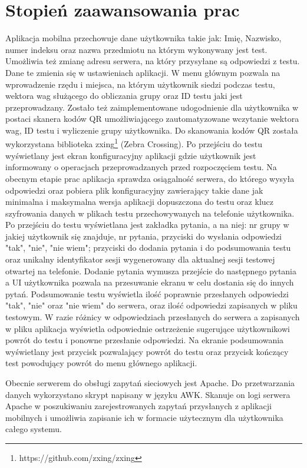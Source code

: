 \documentclass{report}
\begin{document}
	\chapter{Stopień zaawansowania prac}
	
	Aplikacja mobilna przechowuje dane użytkownika takie jak: Imię, Nazwisko, numer indeksu oraz nazwa przedmiotu na którym wykonywany jest test. Umożliwia też zmianę adresu serwera, na który przysyłane są odpowiedzi z testu. Dane te zmienia się w ustawieniach aplikacji. W menu głównym pozwala na wprowadzenie rzędu i miejsca, na którym użytkownik siedzi podczas testu, wektora wag służącego do obliczania grupy oraz ID testu jaki jest przeprowadzany. Zostało też zaimplementowane udogodnienie dla użytkownika w postaci skanera kodów QR umożliwiającego zautomatyzowane wczytanie wektora wag, ID testu i wyliczenie grupy użytkownika. Do skanowania kodów QR została wykorzystana biblioteka zxing\footnote{https://github.com/zxing/zxing} (Zebra Crossing). Po przejściu do testu wyświetlany jest ekran konfiguracyjny aplikacji gdzie użytkownik jest informowany o operacjach przeprowadzanych przed rozpoczęciem testu. Na obecnym etapie prac aplikacja sprawdza osiągalność serwera, do którego wysyła odpowiedzi oraz pobiera plik konfiguracyjny zawierający takie dane jak minimalna i maksymalna wersja aplikacji dopuszczona do testu oraz klucz szyfrowania danych w plikach testu przechowywanych na telefonie użytkownika. Po przejściu do testu wyświetlana jest zakładka pytania, a na niej: nr grupy w jakiej użytkownik się znajduje, nr pytania, przyciski do wysłania odpowiedzi "tak", "nie", "nie wiem"; przyciski do dodania pytania i do podsumowania testu oraz unikalny identyfikator sesji wygenerowany dla aktualnej sesji testowej otwartej na telefonie. Dodanie pytania wymusza przejście do następnego pytania a UI użytkownika pozwala na przesuwanie ekranu w celu dostania się do innych pytań. Podsumowanie testu wyświetla ilość poprawnie przesłanych odpowiedzi "tak", "nie" oraz "nie wiem" do serwera, oraz ilość odpowiedzi zapisanych w pliku testowym. W razie różnicy w odpowiedziach przesłanych do serwera a zapisanych w pliku aplikacja wyświetla odpowiednie ostrzeżenie sugerujące użytkownikowi powrót do testu i ponowne przesłanie odpowiedzi. Na ekranie podsumowania wyświetlany jest przycisk pozwalający powrót do testu oraz przycisk kończący test powodujący powrót do menu głównego aplikacji.
	
	Obecnie serwerem do obsługi zapytań sieciowych jest Apache. Do przetwarzania danych wykorzystano skrypt napisany w języku AWK. Skanuje on logi serwera Apache w poszukiwaniu zarejestrowanych zapytań przysłanych z aplikacji mobilnych i umożliwia zapisanie ich w formacie użytecznym dla użytkownika całego systemu.
	
\end{document}
